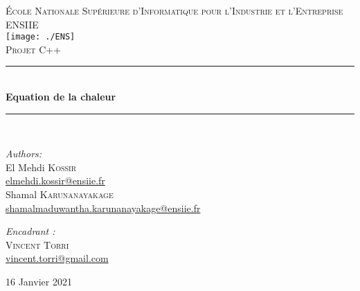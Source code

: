 \documentclass[french]{report}
\newcommand{\HRule}{\rule{\linewidth}{0.5mm}}
\begin{document}
\begin{titlepage}

\begin{center}

\textsc{{\LARGE École Nationale Supérieure d'Informatique pour l'Industrie et l'Entreprise} \\ \vspace{6
    mm} {\Large ENSIIE}} \\
\vspace{5mm}
\texttt{[image: ./ENS]}\\[1.0 cm]

\textsc{\Large   Projet C++}\\[0.5cm]

\HRule \\[0.4cm]
{ \huge \bfseries Equation de la chaleur}\\[0.4cm]

\HRule \\[1.5cm]
\begin{minipage}{0.4\textwidth}
\begin{flushleft} \large
\emph{Authors:}\\
El Mehdi \textsc{Kossir} \\
{\small\href{mailto:prenom1.nom1@ensiie.fr}{elmehdi.kossir@ensiie.fr}}
\\
Shamal \textsc{Karunanayakage} \\
{\small\href{mailto:prenom2.nom2@ensiie.fr}{shamalmaduwantha.karunanayakage@ensiie.fr}}
\end{flushleft}
\end{minipage}
\begin{minipage}{0.4\textwidth}
\begin{flushright} \large
\emph{Encadrant :} \\
 \textsc{Vincent Torri} \\
    {\small\href{mailto:prenom1.nom1@ensiie.fr}{vincent.torri@gmail.com}}
\end{flushright}
\end{minipage}



\vfill
{\Large 16 Janvier 2021}
\end{center}
\end{titlepage} 
\end{document}
